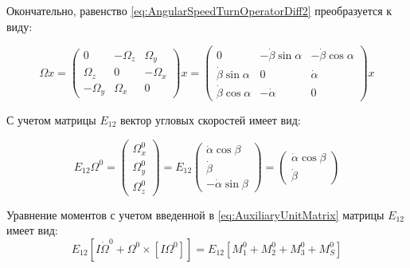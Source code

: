 Окончательно, равенство \ref{eq:AngularSpeedTurnOperatorDiff2} преобразуется к виду:

\begin{equation}
\label{eq:AngularSpeedTurnOperatorDiff2}
\Omega x = \begin{pmatrix}
0 & -\Omega_z & \Omega_y \\
\Omega_z & 0 & -\Omega_x \\
-\Omega_y & \Omega_x & 0
\end{pmatrix}x = \begin{pmatrix}
0 & -\dot{\beta}\sin{\alpha} & -\dot{\beta}\cos{\alpha} \\
\dot{\beta}\sin{\alpha} & 0 & \dot{\alpha} \\
\dot{\beta}\cos{\alpha} & -\dot{\alpha} & 0
\end{pmatrix}x
\end{equation}

С учетом матрицы $E_{12}$ вектор угловых скоростей имеет вид:

\begin{equation}
\label{eq:AngularSpeedInMovingCS}
E_{12}\Omega^0 = \begin{pmatrix}
\Omega_x^0 \\ \Omega_y^0 \\ \Omega_z^0
\end{pmatrix} =
E_{12}\begin{pmatrix}
\dot{\alpha}\cos{\beta} \\ \dot{\beta} \\ -\dot{\alpha}\sin{\beta}
\end{pmatrix} =
\begin{pmatrix}
\dot{\alpha}\cos{\beta} \\ \dot{\beta}
\end{pmatrix}
\end{equation}

Уравнение моментов с учетом введенной в \ref{eq:AuxiliaryUnitMatrix} матрицы $E_{12}$ имеет вид:
\begin{equation}
\label{eq:TorquesEqCommon}
E_{12}\left[I\dot{\Omega}^0 + \Omega^0 \times \left[I\Omega^0\right] \right] =
E_{12}\left[M_1^0 + M_2^0 + M_3^0 + M_S^0\right]
\end{equation}

